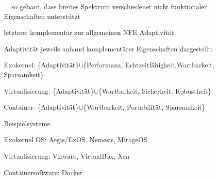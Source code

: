\documentclass[a4paper]{article}
\begin{document}
\begin{multicols}{3}
\begin{itemize*}
\begin{itemize*}
            \item[=] so gebaut, dass breites Spektrum verschiedener nicht funktionaler Eigenschaften unterstützt
            \item letztere: komplementär zur allgemeinen NFE Adaptivität
        \end{itemize*}
        \item Adaptivität jeweils anhand komplementärer Eigenschaften dargestellt:
        \begin{itemize*}
            \item Exokernel: \{Adaptivität\}$\cup$\{Performanz, Echtzeitfähigkeit,Wartbarkeit, Sparsamkeit\}
            \item Virtualisierung: \{Adaptivität\}$\cup$\{Wartbarkeit, Sicherheit, Robustheit\}
            \item Container: \{Adaptivität\}$\cup$\{Wartbarkeit, Portabilität, Sparsamkeit\}
        \end{itemize*}
        \item Beispielsysteme
        \begin{itemize*}
            \item Exokernel OS: Aegis/ExOS, Nemesis, MirageOS
            \item Virtualisierung: Vmware, VirtualBox, Xen
            \item Containersoftware: Docker
        \end{itemize*}
    \end{itemize*}


\end{multicols}
\end{document}
